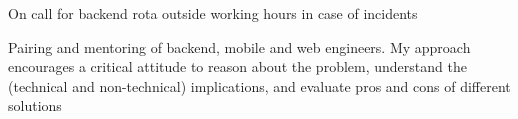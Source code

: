 \begin{cventries}
{\begin{cvitems}
    \item On call for backend rota outside working hours in case of incidents 
 \item Pairing and mentoring of backend, mobile and web engineers. My approach encourages a critical attitude to reason about the problem, understand the (technical and non-technical) implications, and evaluate pros and cons of different solutions
	\end{cvitems}
}


\end{cventries}
